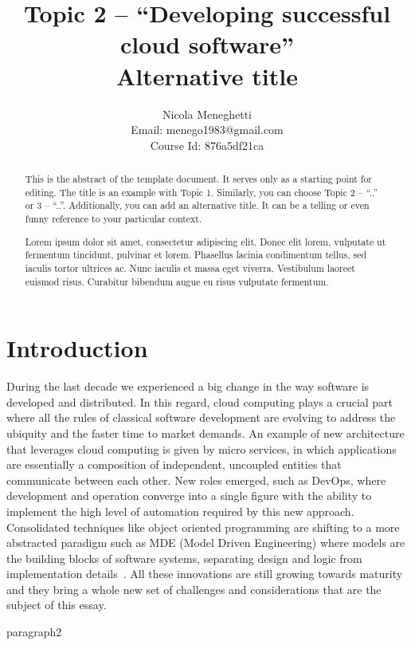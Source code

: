 \documentclass[a4paper, 10pt, conference]{ieeeconf}
\title{Topic 2 -- ``Developing successful cloud software'' \\
\large{Alternative title}} %
\author{Nicola Meneghetti \\
	Email: menego1983@gmail.com \\
	Course Id: 876a5df21ca
}
\begin{document}
\maketitle
\thispagestyle{empty}
\pagestyle{empty}

\begin{abstract}

This is the abstract of the template document. It serves only as a starting point for editing. The title is an example with Topic 1. Similarly, you can choose Topic 2 -- ``..'' or 3 -- ``..''. Additionally, you can add an alternative title. It can be a telling or even funny reference to your particular context.

Lorem ipsum dolor sit amet, consectetur adipiscing elit. Donec elit lorem, vulputate ut fermentum tincidunt, pulvinar et lorem. Phasellus lacinia condimentum tellus, sed iaculis tortor ultrices ac. Nunc iaculis et massa eget viverra. Vestibulum laoreet euismod risus. Curabitur bibendum augue eu risus vulputate fermentum.

\end{abstract}

\section{Introduction}

During the last decade we experienced a big change in the way software is developed and distributed. In this regard, cloud computing plays a crucial part where all the rules of classical software development are evolving to address the ubiquity and the faster time to market demands. An example of new architecture that leverages cloud computing is given by micro services, in which applications are essentially a composition of independent, uncoupled entities that communicate between each other. New roles emerged, such as DevOps, where development and operation converge into a single figure with the ability to implement the high level of automation required by this new approach. Consolidated techniques like object oriented programming are shifting to a more abstracted paradigm such as MDE (Model Driven Engineering) where models are the building blocks of software systems, separating design and logic from implementation details~\cite{overview-platforms, fuggetta2014software}. All these innovations are still growing towards maturity and they bring  a whole new set of challenges and considerations that are the subject of this essay.

paragraph2
\end{document}

